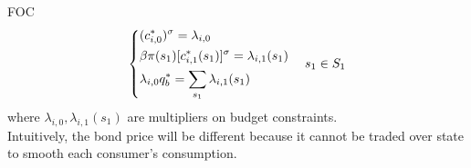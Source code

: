\documentclass{article}
\begin{document}
\begin{enumerate}
\begin{enumerate}
\begin{enumerate}
                \end{enumerate}
                FOC
                \[\begin{dcases}
                    (c_{i,0}^\ast)^{\sigma}=\lambda_{i,0}\\
                    \beta\pi(s_1)[c_{i,1}^\ast(s_1)]^{\sigma}=\lambda_{i,1}(s_1)\\
                    \lambda_{i,0}q_{b}^\ast=\sum_{s_1}\lambda_{i,1}(s_1)
                \end{dcases}\quad s_1\in S_1\]
                where \(\lambda_{i,0},\lambda_{i,1}(s_1)\) are multipliers on budget constraints.\\
                Intuitively, the bond price will be different because it cannot be traded over state to smooth each consumer's consumption.  
        \end{enumerate}
    \end{enumerate}
\end{document}
